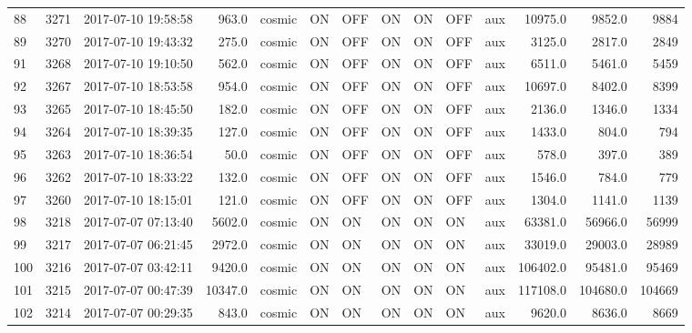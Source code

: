\begin{tabular}{lrlrlllllllrrr}
88  &  3271 &  2017-07-10 19:58:58 &     963.0 &   cosmic &  ON &  OFF &   ON &  ON &  OFF &       aux &     10975.0 &       9852.0 &                9884 \\
89  &  3270 &  2017-07-10 19:43:32 &     275.0 &   cosmic &  ON &  OFF &   ON &  ON &  OFF &       aux &      3125.0 &       2817.0 &                2849 \\
91  &  3268 &  2017-07-10 19:10:50 &     562.0 &   cosmic &  ON &  OFF &   ON &  ON &  OFF &       aux &      6511.0 &       5461.0 &                5459 \\
92  &  3267 &  2017-07-10 18:53:58 &     954.0 &   cosmic &  ON &  OFF &   ON &  ON &  OFF &       aux &     10697.0 &       8402.0 &                8399 \\
93  &  3265 &  2017-07-10 18:45:50 &     182.0 &   cosmic &  ON &  OFF &   ON &  ON &  OFF &       aux &      2136.0 &       1346.0 &                1334 \\
94  &  3264 &  2017-07-10 18:39:35 &     127.0 &   cosmic &  ON &  OFF &   ON &  ON &  OFF &       aux &      1433.0 &        804.0 &                 794 \\
95  &  3263 &  2017-07-10 18:36:54 &      50.0 &   cosmic &  ON &  OFF &   ON &  ON &  OFF &       aux &       578.0 &        397.0 &                 389 \\
96  &  3262 &  2017-07-10 18:33:22 &     132.0 &   cosmic &  ON &  OFF &   ON &  ON &  OFF &       aux &      1546.0 &        784.0 &                 779 \\
97  &  3260 &  2017-07-10 18:15:01 &     121.0 &   cosmic &  ON &  OFF &   ON &  ON &  OFF &       aux &      1304.0 &       1141.0 &                1139 \\
98  &  3218 &  2017-07-07 07:13:40 &    5602.0 &   cosmic &  ON &   ON &   ON &  ON &   ON &       aux &     63381.0 &      56966.0 &               56999 \\
99  &  3217 &  2017-07-07 06:21:45 &    2972.0 &   cosmic &  ON &   ON &   ON &  ON &   ON &       aux &     33019.0 &      29003.0 &               28989 \\
100 &  3216 &  2017-07-07 03:42:11 &    9420.0 &   cosmic &  ON &   ON &   ON &  ON &   ON &       aux &    106402.0 &      95481.0 &               95469 \\
101 &  3215 &  2017-07-07 00:47:39 &   10347.0 &   cosmic &  ON &   ON &   ON &  ON &   ON &       aux &    117108.0 &     104680.0 &              104669 \\
102 &  3214 &  2017-07-07 00:29:35 &     843.0 &   cosmic &  ON &   ON &   ON &  ON &   ON &       aux &      9620.0 &       8636.0 &                8669 \\

\end{tabular}
